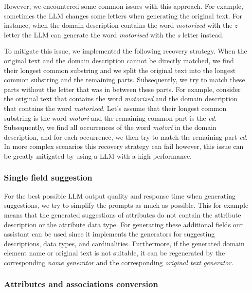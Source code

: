 However, we encountered some common issues with this approach. For example, sometimes the LLM changes some letters when generating the original text. For instance, when the domain description contains the word \textit{motorized} with the \textit{z} letter the LLM can generate the word \textit{motorised} with the \textit{s} letter instead.

To mitigate this issue, we implemented the following recovery strategy. When the original text and the domain description cannot be directly matched, we find their longest common substring and we split the original text into the longest common substring and the remaining parts. Subsequently, we try to match these parts without the letter that was in between these parts. For example, consider the original text that contains the word \textit{motorized} and the domain description that contains the word \textit{motorised}. Let's assume that their longest common substring is the word \textit{motori} and the remaining common part is the {\textit{ed}}. Subsequently, we find all occurrences of the word \textit{motori} in the domain description, and for each occurrence, we then try to match the remaining part \textit{ed}. In more complex scenarios this recovery strategy can fail however, this issue can be greatly mitigated by using a LLM with a high performance.


\subsubsection{Single field suggestion}

For the best possible LLM output quality and response time when generating suggestions, we try to simplify the prompts as much as possible. This for example means that the generated suggestions of attributes do not contain the attribute description or the attribute data type. For generating these additional fields our assistant can be used since it implements the generators for suggesting descriptions, data types, and cardinalities. Furthermore, if the generated domain element name or original text is not suitable, it can be regenerated by the corresponding \emph{name generator} and the corresponding \emph{original text generator}.


\subsubsection{Attributes and associations conversion}
\label{sec:attributes_and_associations_conversion}


